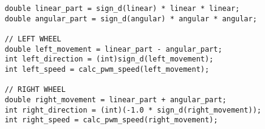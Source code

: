 \begin{flushleft}
\label{robot_code_snippet}    

\begin{lstlisting}
    double linear_part = sign_d(linear) * linear * linear;
    double angular_part = sign_d(angular) * angular * angular;

    // LEFT WHEEL
    double left_movement = linear_part - angular_part;
    int left_direction = (int)sign_d(left_movement);
    int left_speed = calc_pwm_speed(left_movement);

    // RIGHT WHEEL
    double right_movement = linear_part + angular_part;
    int right_direction = (int)(-1.0 * sign_d(right_movement));
    int right_speed = calc_pwm_speed(right_movement);

\end{lstlisting}

\end{flushleft}
